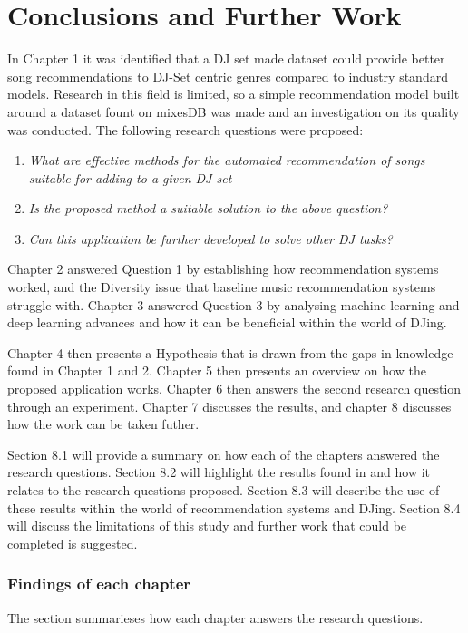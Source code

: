 
\graphicspath{{Chapter7/}}

\chapter{Conclusions and Further Work} 

In Chapter 1 it was identified that a DJ set made dataset could provide better song recommendations to DJ-Set centric genres compared to industry standard models. Research in this field is limited, so a simple recommendation model built around a dataset fount on mixesDB was made and an investigation on its quality was conducted. The following research questions were proposed:

\begin{enumerate}
	\item \textit{What are effective methods for the automated recommendation of songs suitable
		for adding to a given DJ set}
	\item \textit{Is the proposed method a suitable solution to the above question?}
	\item \textit{Can this application be further developed to solve other DJ tasks?}
\end{enumerate}

Chapter 2 answered Question 1 by establishing how recommendation systems worked, and the Diversity issue that baseline music recommendation systems struggle with. Chapter 3 answered Question 3 by analysing machine learning and deep learning advances and how it can be beneficial within the world of DJing. 

Chapter 4 then presents a Hypothesis that is drawn from the gaps in knowledge found in Chapter 1 and 2. Chapter 5 then presents an overview on how the proposed application works. Chapter 6 then answers the second research question through an experiment. Chapter 7 discusses the results, and chapter 8 discusses how the work can be taken futher.

Section 8.1 will provide a summary on how each of the chapters answered the research questions.
Section 8.2 will highlight the results found in and how it relates to the research questions proposed. Section 8.3 will describe the use of these results within the world of  recommendation systems and DJing. Section 8.4 will discuss the limitations of
this  study and  further work that could be completed is suggested.

\subsection{Findings of each chapter}
The section summarieses how each chapter answers the research questions.

